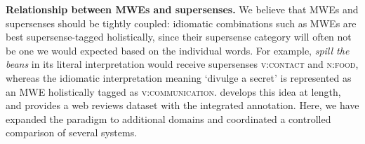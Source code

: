 \documentclass[11pt,letterpaper]{article}
\newcommand{\sst}[1]{\textsc{#1}} %
\newcommand{\lex}[1]{\textit{#1}} %
\newcommand{\longversion}[1]{#1} %
\begin{document}
% 
% 


\textbf{Relationship between MWEs and supersenses.}
We believe that MWEs and supersenses should be tightly coupled:
idiomatic combinations such as MWEs are best supersense-tagged holistically,
since their supersense category will often not be one we would expected based on the individual words.
For example, \lex{spill the beans} in its literal interpretation
would receive supersenses \sst{v:contact} and \sst{n:food},
whereas the idiomatic interpretation meaning `divulge a secret' is represented as
an MWE holistically tagged as \sst{v:communication}.
 develops this idea at length, and provides a web reviews dataset
with the integrated annotation. Here, we have expanded the paradigm to additional domains
and coordinated a controlled comparison of several systems.
\end{document}

